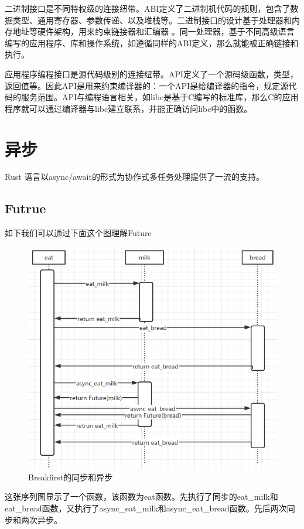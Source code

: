二进制接口是不同特权级的连接纽带。ABI定义了二进制机代码的规则，包含了数据类型、通用寄存器、参数传递、以及堆栈等。二进制接口的设计基于处理器和内存地址等硬件架构，用来约束链接器和汇编器 。同一处理器，基于不同高级语言编写的应用程序、库和操作系统，如遵循同样的ABI定义，那么就能被正确链接和执行。

应用程序编程接口是源代码级别的连接纽带。API定义了一个源码级函数，类型，返回值等。因此API是用来约束编译器的：一个API是给编译器的指令，规定源代码的服务范围。API与编程语言相关，如libc是基于C编写的标准库，那么C的应用程序就可以通过编译器与libc建立联系，并能正确访问libc中的函数。

\section{异步}

Rust 语言以async/await的形式为协作式多任务处理提供了一流的支持。

\subsection{Futrue}

如下我们可以通过下面这个图理解Future

\begin{figure}[htb]
    \figureCapSet
    \centering
    \includegraphics[width=.8\linewidth]{figure/c2/breakfirstsequence.png}
    \caption{Breakfirst的同步和异步}
    \label{figure:c2breakfirstsequence}
\end{figure}

这张序列图显示了一个函数，该函数为eat函数。先执行了同步的eat\_milk和eat\_bread函数，又执行了async\_eat\_milk和async\_eat\_bread函数。先后两次同步和两次异步。



